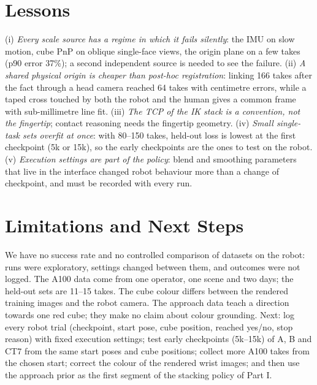 \documentclass[conference,10pt]{IEEEtran}
\begin{document}
\section{Lessons}\label{p2:sec:lessons}
(i) \emph{Every scale source has a regime in which it fails silently}: the IMU on slow motion, cube PnP on oblique single-face
views, the origin plane on a few takes (p90 error 37\%); a second independent source is needed to see the failure.
(ii) \emph{A shared physical origin is cheaper than post-hoc registration}: linking 166 takes after the fact through a head
camera reached 64 takes with centimetre errors, while a taped cross touched by both the robot and the human gives a common
frame with sub-millimetre line fit. (iii) \emph{The TCP of the IK stack is a convention, not the fingertip}; contact
reasoning needs the fingertip geometry. (iv) \emph{Small single-task sets overfit at once}: with 80--150 takes, held-out loss
is lowest at the first checkpoint (5k or 15k), so the early checkpoints are the ones to test on the robot. (v) \emph{Execution
settings are part of the policy}: blend and smoothing parameters that live in the interface changed robot behaviour more than
a change of checkpoint, and must be recorded with every run.

\section{Limitations and Next Steps}\label{p2:sec:lim}
We have no success rate and no controlled comparison of datasets on the robot: runs were exploratory, settings changed between
them, and outcomes were not logged. The A100 data come from one operator, one scene and two days; the held-out sets are 11--15
takes. The cube colour differs between the rendered training images and the robot camera. The approach data teach a direction
towards one red cube; they make no claim about colour grounding. Next: log every robot trial (checkpoint, start pose, cube
position, reached yes/no, stop reason) with fixed execution settings; test early checkpoints (5k--15k) of A, B and CT7 from
the same start poses and cube positions; collect more A100 takes from the chosen start; correct the colour of the rendered
wrist images; and then use the approach prior as the first segment of the stacking policy of Part I.
\end{document}
